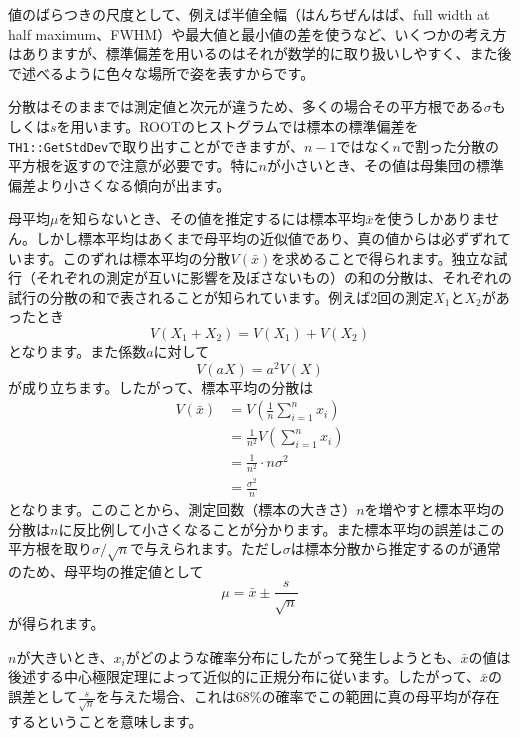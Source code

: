 値のばらつきの尺度として、例えば半値全幅（はんちぜんはば、full width at half maximum、FWHM）や最大値と最小値の差を使うなど、いくつかの考え方はありますが、標準偏差を用いるのはそれが数学的に取り扱いしやすく、また後で述べるように色々な場所で姿を表すからです。

分散はそのままでは測定値と次元が違うため、多くの場合その平方根である$\sigma$もしくは$s$を用います。ROOTのヒストグラムでは標本の標準偏差を\texttt{TH1::GetStdDev}で取り出すことができますが、$n-1$ではなく$n$で割った分散の平方根を返すので注意が必要です。特に$n$が小さいとき、その値は母集団の標準偏差より小さくなる傾向が出ます。

母平均$\mu$を知らないとき、その値を推定するには標本平均$\bar{x}$を使うしかありません。しかし標本平均はあくまで母平均の近似値であり、真の値からは必ずずれています。このずれは標本平均の分散$V(\bar{x})$を求めることで得られます。独立な試行（それぞれの測定が互いに影響を及ぼさないもの）の和の分散は、それぞれの試行の分散の和で表されることが知られています。例えば2回の測定$X_1$と$X_2$があったとき
\begin{equation}
  V(X_1+X_2)=V(X_1)+V(X_2)
\end{equation}
となります。また係数$a$に対して
\begin{equation}
  V(aX)=a^2V(X)
\end{equation}
が成り立ちます。したがって、標本平均の分散は
\begin{align}
  V(\bar{x})&=V\left ( \frac{1}{n}\sum_{i=1}^n x_i \right ) \\
  &= \frac{1}{n^2}V\left (\sum_{i=1}^n x_i \right ) \\
  &=\frac{1}{n^2}\cdot n \sigma^2\\
  &=\frac{\sigma^2}{n}
\end{align}
となります。このことから、測定回数（標本の大きさ）$n$を増やすと標本平均の分散は$n$に反比例して小さくなることが分かります。また標本平均の誤差はこの平方根を取り$\sigma/\sqrt{n}$で与えられます。ただし$\sigma$は標本分散から推定するのが通常のため、母平均の推定値として
\begin{equation}
  \mu = \bar{x}\pm\frac{s}{\sqrt{n}}
  \label{eq_estimated_mean}
\end{equation}
が得られます。

$n$が大きいとき、$x_i$がどのような確率分布にしたがって発生しようとも、$\bar{x}$の値は後述する中心極限定理によって近似的に正規分布に従います。したがって、$\bar{x}$の誤差として$\frac{s}{\sqrt{n}}$を与えた場合、これは68\%の確率でこの範囲に真の母平均が存在するということを意味します。

